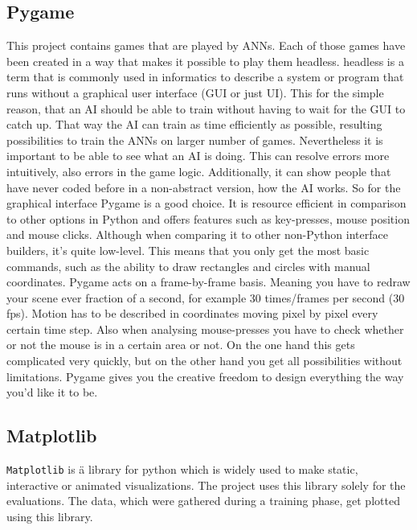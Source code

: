 \documentclass[12pt]{article}
\begin{document}
\subsection{Pygame}
This project contains games that are played by \glspl{ANN}. Each of those games have been created in a way that makes it possible to play them \gls{headless}. \Gls{headless} is a term that is commonly used in informatics to describe a system or program that runs without a graphical user interface (GUI or just UI). This for the simple reason, that an \gls{AI} should be able to train without having to wait for the GUI to catch up. That way the \gls{AI} can train as time efficiently as possible, resulting possibilities to train the \glspl{ANN} on larger number of games. Nevertheless it is important to be able to see what an \gls{AI} is doing. This can resolve errors more intuitively, also errors in the game logic. Additionally, it can show people that have never coded before in a non-abstract version, how the \gls{AI} works. So for the graphical interface Pygame is a good choice. It is resource efficient in comparison to other options in Python and offers features such as key-presses, mouse position and mouse clicks. Although when comparing it to other non-Python interface builders, it's quite \gls{low-level}. This means that you only get the most basic commands, such as the ability to draw rectangles and circles with manual coordinates. Pygame acts on a frame-by-frame basis. Meaning you have to redraw your scene ever fraction of a second, for example 30 times/frames per second (30 fps). Motion has to be described in coordinates moving pixel by pixel every certain time step. Also when analysing mouse-presses you have to check whether or not the mouse is in a certain area or not. On the one hand this gets complicated very quickly, but on the other hand you get all possibilities without limitations. Pygame gives you the creative freedom to design everything the way you'd like it to be. \cite{PyGame}
\subsection{Matplotlib}
\lstinline{Matplotlib} is ä library for python which is widely used to make static, interactive or animated visualizations. The project uses this library solely for the evaluations. The data, which were gathered during a training phase, get plotted using this library.
\end{document}
